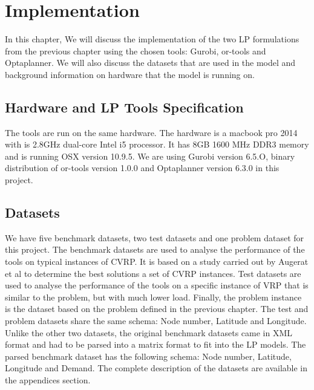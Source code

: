 \chapter{Implementation}
In this chapter, We will discuss the implementation
of the two LP formulations from the previous chapter using the chosen tools: Gurobi, or-tools and Optaplanner. We will
also discuss the datasets that are used in the model and background information on hardware that the model is running on.

\section{Hardware and LP Tools Specification}
The tools are run on the same hardware. The hardware is a macbook pro 2014 with is 2.8GHz dual-core Intel i5 processor. It has
8GB 1600 MHz DDR3 memory and is running OSX version 10.9.5. We are using Gurobi version 6.5.O, binary distribution of or-tools version 1.0.0
and Optaplanner version 6.3.0 in this project.

\section{Datasets}
We have five benchmark datasets, two test datasets and one problem dataset for this project.
The benchmark datasets are used to analyse the performance of the tools on typical instances of CVRP. It is based on a study carried out
by Augerat et al \cite{Augerat1998} to determine the best solutions a set of CVRP instances. Test datasets are used to
analyse the performance of the tools on a specific instance of VRP that is similar to the problem, but with much lower load.
Finally, the problem instance is the dataset based on the problem defined in the previous chapter. The test and problem datasets
share the same schema: Node number, Latitude and Longitude. Unlike the other two datasets, the original benchmark datasets came in
XML format and had to be parsed into a matrix format to fit into the LP models. The parsed benchmark dataset has the following schema:
Node number, Latitude, Longitude and Demand. The complete description of the datasets are available in the appendices section.

